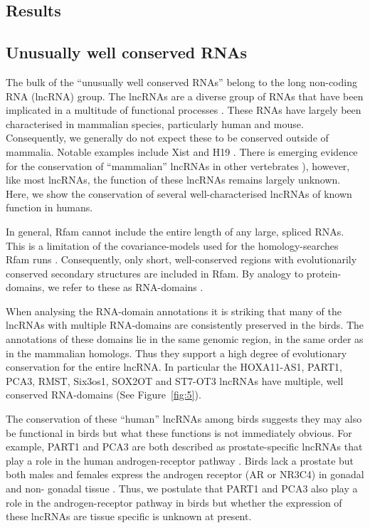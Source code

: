 \documentclass[10pt]{bmc_article}
\newenvironment{bmcformat}{\begin{raggedright}\baselineskip20pt\sloppy\setboolean{publ}{false}}{\end{raggedright}\baselineskip20pt\sloppy}
\begin{document}
\begin{bmcformat}
\section*{Results}


\subsection*{Unusually well conserved RNAs}

The bulk of the ``unusually well conserved RNAs'' belong to the long
non-coding RNA (lncRNA) group.  The lncRNAs are a diverse group of
RNAs that have been implicated in a multitude of functional processes
\cite{Rinn:2007,Chow:2005,Guttman:2009}. These RNAs have largely been
characterised in mammalian species, particularly human and
mouse. Consequently, we generally do not expect these to be conserved
outside of mammalia. Notable examples include Xist \cite{Duret:2006}
and H19 \cite{Smits:2008}.  There is emerging evidence for the
conservation of ``mammalian'' lncRNAs in other vertebrates
\cite{Chodroff:2010,Ulitsky:2011}), however, like most lncRNAs, the
function of these lncRNAs remains largely unknown. Here, we show the
conservation of several well-characterised lncRNAs of known function
in humans. 

In general, Rfam cannot include the entire length of any large, spliced
RNAs. This is a limitation of the covariance-models used for the
homology-searches Rfam runs \cite{Nawrocki:2009}. Consequently, only
short, well-conserved regions with evolutionarily conserved secondary
structures are included in Rfam. By analogy to protein-domains, we
refer to these as RNA-domains \cite{Burge:2013}.

When analysing the RNA-domain annotations it is striking that many of
the lncRNAs with multiple RNA-domains are consistently preserved in
the birds. The annotations of these domains lie in the same genomic
region, in the same order as in the mammalian homologs. Thus they
support a high degree of evolutionary conservation for the entire
lncRNA. In particular the HOXA11-AS1, PART1, PCA3, RMST, Six3os1, SOX2OT and
ST7-OT3 lncRNAs have multiple, well conserved RNA-domains (See
Figure~\ref{fig:5}).

The conservation of these ``human'' lncRNAs among birds suggests they may 
also be functional in birds but what these
functions is not immediately obvious. For example, PART1 and
PCA3 are both described as prostate-specific lncRNAs that play a role
in the human androgen-receptor pathway
\cite{Bussemakers:1999,Lin:2000,Ferreira:2012}. Birds lack a prostate
but both males and females express the androgen receptor (AR or NR3C4) in gonadal
and non- gonadal tissue
\cite{Yoshimura:1993,Veney:2004,Fuxjager:2012,Leska:2012}. Thus, we
postulate that PART1 and PCA3 also play a role in the
androgen-receptor pathway in birds but whether the expression of these
lncRNAs are tissue specific is unknown at present.


\end{bmcformat}
\end{document}
